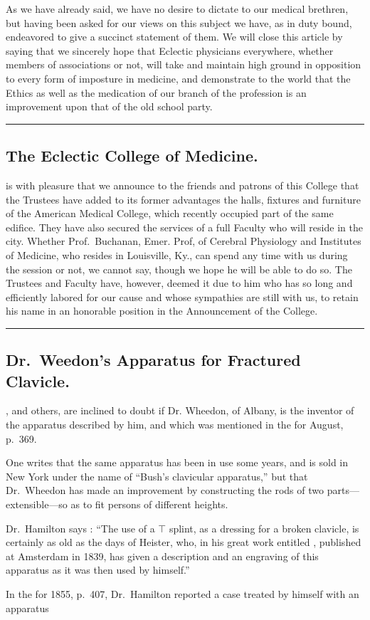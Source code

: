 
As we have already said, we have no desire to dictate to our medical
brethren, but having been asked for our views on this subject we
have, as in duty bound, endeavored to give a succinct statement of them.
We will close this article by saying that we sincerely hope that Eclectic
physicians everywhere, whether members of associations or not, will
take and maintain high ground in opposition to every form of imposture
in medicine, and demonstrate to the world that the Ethics as well
as the medication of our branch of the profession is an improvement
upon that of the old school party.

\fancybreak{*}

\subsection*{The Eclectic College of Medicine.}

 is with pleasure that we announce to the friends and patrons of this
College that the Trustees have added to its former advantages the halls,
fixtures and furniture of the American Medical College, which recently
occupied part of the same edifice. They have also secured the services
of a full Faculty who will reside in the city. Whether Prof.~Buchanan,
Emer. Prof, of Cerebral Physiology and Institutes of Medicine, who
resides in Louisville, Ky., can spend any time with us during the session
or not, we cannot say, though we hope he will be able to do so. The
Trustees and Faculty have, however, deemed it due to him who has so
long and efficiently labored for our cause and whose sympathies are still
with us, to retain his name in an honorable position in the Announcement
of the College.

\fancybreak{*}

\subsection*{Dr.~Weedon's Apparatus for Fractured Clavicle.}

, and others, are inclined to doubt if Dr.
Wheedon, of Albany, is the inventor of the apparatus described by him,
and which was mentioned in the  for August, p.\ 369.

One writes that the same apparatus has been in use some years, and
is sold in New York under the name of ``Bush's clavicular apparatus,''
but that Dr.~Wheedon has made an improvement by constructing the
rods of two parts---extensible---so as to fit persons of different heights.

Dr.~Hamilton says : ``The use of a $\top$ splint, as a dressing for a broken
clavicle, is certainly as old as the days of Heister, who, in his great work
entitled , published at Amsterdam in 1839, has
given a description and an engraving of this apparatus as it was then
used by himself.''

In the  for 1855,
p.~407, Dr.~Hamilton reported a case treated by himself with an apparatus\endinput
